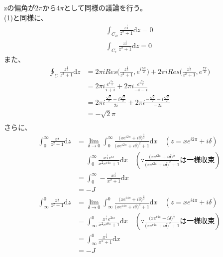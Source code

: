 \documentclass[dvipdfmx,a4paper]{jsarticle}
\begin{document}
 \subsection{}
 zの偏角が$2\pi$から$4\pi$として同様の議論を行う。\\
 (1)と同様に、
 \begin{align*}
 \int_{C_R}\frac{z^{\frac{1}{2}}}{z^2 + 1}\mathrm{d}z = 0\\
\int_{C_{\epsilon}}\frac{z^{\frac{1}{2}}}{z^2 + 1}\mathrm{d}z = 0
 \end{align*}
 また、
 \begin{align*}
 \oint_C\frac{z^{\frac{1}{2}}}{z^2 + 1}\mathrm{d}z &= 2\pi iRes\biggl(\frac{z^{\frac{1}{2}}}{z^2 + 1}, e^{i\frac{5\pi}{2}}\biggr) + 2\pi iRes\biggl(\frac{z^{\frac{1}{2}}}{z^2 + 1}, e^{\frac{7\pi}{2}}\biggr)\\
 &= 2\pi i\frac{e^{i\frac{5\pi}{4}}}{i + i} + 2\pi i\frac{e^{i\frac{7\pi}{4}}}{-i - i}\\
 &= 2\pi i\frac{\frac{\sqrt{2}}{2} - i\frac{\sqrt{2}}{2}}{2i} + 2\pi i\frac{-\frac{\sqrt{2}}{2} - i\frac{\sqrt{2}}{2}}{-2i}\\
 &= -\sqrt{2}\pi\\
 \end{align*}
 さらに、
 \begin{align*}
  \int_{0}^{\infty} \frac{z^{\frac{1}{2}}}{z^2 + 1} \mathrm{d}z &= \lim_{\delta \to 0}\int_{0}^{\infty}\frac{\bigl(xe^{i2\pi} + i\delta\bigr)^{\frac{1}{2}}}{\bigl(xe^{i2\pi} + i\delta\bigr)^2 + 1} \mathrm{d}x \quad(z = xe^{i2\pi} + i\delta)\\
 &= \int_{0}^{\infty} \frac{x^{\frac{1}{2}}e^{i\pi}}{x^2e^{i4\pi} + 1} \mathrm{d}x\quad(\because\frac{\bigl(xe^{i2\pi} + i\delta\bigr)^{\frac{1}{2}}}{\bigl(xe^{i2\pi} + i\delta\bigr)^2 + 1}は一様収束)\\
 &= \int_{0}^{\infty} -\frac{x^{\frac{1}{2}}}{x^2 + 1} \mathrm{d}x\\
  &= -J\\
 \int_{\infty}^{0} \frac{z^{\frac{1}{2}}}{z^2 + 1} \mathrm{d}z &= \lim_{\delta \to 0}\int_{\infty}^{0} \frac{\bigl(xe^{i4\pi} + i\delta\bigr)^{\frac{1}{2}}}{\bigl(xe^{i4\pi} + i\delta\bigr)^2 + 1} \mathrm{d}x \quad(z = xe^{i4\pi} + i\delta)\\
 &= \int_{\infty}^{0} \frac{x^{\frac{1}{2}}e^{2i\pi}}{x^2e^{i8\pi} + 1} \mathrm{d}x\quad(\because\frac{\bigl(xe^{i4\pi} + i\delta\bigr)^{\frac{1}{2}}}{\bigl(xe^{i4\pi} + i\delta\bigr)^2 + 1}は一様収束)\\
 &= \int_{\infty}^{0} \frac{x^{\frac{1}{2}}}{x^2 + 1} \mathrm{d}x\\
  &= -J
 \end{align*}
\end{document}
